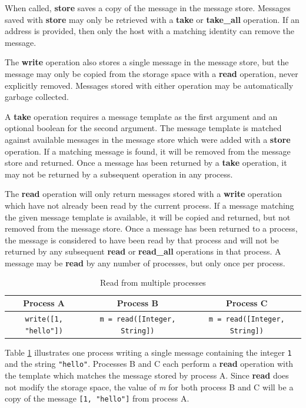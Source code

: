 \documentclass{llncs}
\begin{document}
When called, \textbf{store} saves a copy of the message in the message store. Messages saved with \textbf{store} may only be retrieved with a \textbf{take} or \textbf{take\_all} operation. If an address is provided, then only the host with a matching identity can remove the message.

The \textbf{write} operation also stores a single message in the message store, but the message may only be copied from the storage space with a \textbf{read} operation, never explicitly removed. Messages stored with either operation may be automatically garbage collected.

A \textbf{take} operation requires a message template as the first argument and an optional boolean for the second argument. The message template is matched against available messages in the message store which were added with a \textbf{store} operation. If a matching message is found, it will be removed from the message store and returned. Once a message has been returned by a \textbf{take} operation, it may not be returned by a subsequent operation in any process.

The \textbf{read} operation will only return messages stored with a \textbf{write} operation which have not already been read by the current process. If a message matching the given message template is available, it will be copied and returned, but not removed from the message store. Once a message has been returned to a process, the message is considered to have been read by that process and will not be returned by any subsequent \textbf{read} or \textbf{read\_all} operations in that process. A message may be \textbf{read} by any number of processes, but only once per process.

\begin{table}
\centering
\caption{Read from multiple processes}
\begin{tabular}{|c|c|c|} \hline
\textbf{Process A} & \textbf{Process B} & \textbf{Process C} \\ \hline
\texttt{write([1, "hello"])} & \texttt{m = read([Integer, String])} & \texttt{m = read([Integer, String])} \\ \hline
\end{tabular}
\label{fig:readprocesses}
\end{table}

Table \ref{fig:readprocesses} illustrates one process writing a single message containing the integer \texttt{1} and the string \texttt{"hello"}. Processes B and C each perform a \textbf{read} operation with the template which matches the message stored by process A. Since \textbf{read} does not modify the storage space, the value of \textit{m} for both process B and C will be a copy of the message \texttt{[1, "hello"]} from process A.
\end{document}
